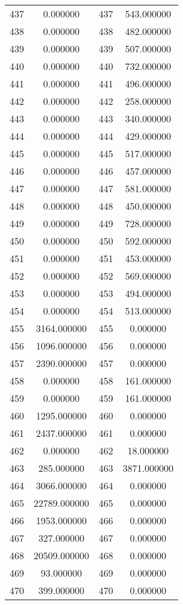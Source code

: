 \documentclass[12pt]{article}
\begin{document}
\begin{longtable}{@{}cccc@{}}
437 & 0.000000 & 437 & 543.000000 \\
438 & 0.000000 & 438 & 482.000000 \\
439 & 0.000000 & 439 & 507.000000 \\
440 & 0.000000 & 440 & 732.000000 \\
441 & 0.000000 & 441 & 496.000000 \\
442 & 0.000000 & 442 & 258.000000 \\
443 & 0.000000 & 443 & 340.000000 \\
444 & 0.000000 & 444 & 429.000000 \\
445 & 0.000000 & 445 & 517.000000 \\
446 & 0.000000 & 446 & 457.000000 \\
447 & 0.000000 & 447 & 581.000000 \\
448 & 0.000000 & 448 & 450.000000 \\
449 & 0.000000 & 449 & 728.000000 \\
450 & 0.000000 & 450 & 592.000000 \\
451 & 0.000000 & 451 & 453.000000 \\
452 & 0.000000 & 452 & 569.000000 \\
453 & 0.000000 & 453 & 494.000000 \\
454 & 0.000000 & 454 & 513.000000 \\
455 & 3164.000000 & 455 & 0.000000 \\
456 & 1096.000000 & 456 & 0.000000 \\
457 & 2390.000000 & 457 & 0.000000 \\
458 & 0.000000 & 458 & 161.000000 \\
459 & 0.000000 & 459 & 161.000000 \\
460 & 1295.000000 & 460 & 0.000000 \\
461 & 2437.000000 & 461 & 0.000000 \\
462 & 0.000000 & 462 & 18.000000 \\
463 & 285.000000 & 463 & 3871.000000 \\
464 & 3066.000000 & 464 & 0.000000 \\
465 & 22789.000000 & 465 & 0.000000 \\
466 & 1953.000000 & 466 & 0.000000 \\
467 & 327.000000 & 467 & 0.000000 \\
468 & 20509.000000 & 468 & 0.000000 \\
469 & 93.000000 & 469 & 0.000000 \\
470 & 399.000000 & 470 & 0.000000 \\

\end{longtable}
\end{document}
